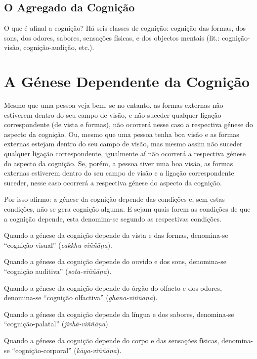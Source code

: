 \subsection{O Agregado da Cognição}


O que é afinal a cognição? Há seis classes de cognição: cognição das formas, dos
sons, dos odores, sabores, sensações físicas, e dos objectos mentais (lit.:
cognição-visão, cognição-audição, etc.).


\section{A Génese Dependente da Cognição}

Mesmo que uma pessoa veja bem, se no entanto, as formas externas não estiverem
dentro do seu campo de visão, e não suceder qualquer ligação correspondente (de
vista e formas), não ocorrerá nesse caso a respectiva génese do aspecto da
cognição. Ou, mesmo que uma pessoa tenha boa visão e as formas externas estejam
dentro do seu campo de visão, mas mesmo assim não suceder qualquer ligação
correspondente, igualmente aí não ocorrerá a respectiva génese do aspecto da
cognição. Se, porém, a pessoa tiver uma boa visão, as formas externas estiverem
dentro do seu campo de visão e a ligação correspondente suceder, nesse caso
ocorrerá a respectiva génese do aspecto da cognição.


Por isso afirmo: a génese da cognição depende das condições e, sem estas
condições, não se gera cognição alguma. E sejam quais forem as condições de que
a cognição depende, esta denomina-se segundo as respectivas condições.

Quando a génese da cognição depende da vista e das formas, denomina-se
``cognição visual'' (\emph{cakkhu-viññāṇa}).

Quando a génese da cognição depende do ouvido e dos sons, denomina-se ``cognição
auditiva'' (\emph{sota-viññāṇa}).

Quando a génese da cognição depende do órgão do olfacto e dos odores,
denomina-se ``cognição olfactiva'' (\emph{ghāna-viññāṇa}).

Quando a génese da cognição depende da língua e dos sabores, denomina-se
``cognição-palatal'' (\emph{jivhā-viññāṇa}).

Quando a génese da cognição depende do corpo e das sensações físicas,
denomina-se ``cognição-corporal'' (\emph{kāya-viññāṇa}).

